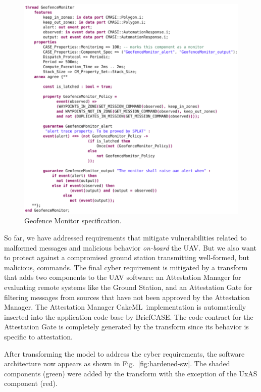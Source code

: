 \documentclass[global,twocolumn]{svjour}
\newcommand{\figref}[1]{Fig.~\ref{#1}}
\newcommand{\brfcs}{BriefCASE}
\newcommand{\ckml}{CakeML}
\begin{document}
\begin{figure}[h]
	\centering
	\includegraphics[width=1\columnwidth]{figs/geofence-monitor.png}
	\caption{Geofence Monitor specification.}
	\label{fig:geofence-monitor}
\end{figure}

So far, we have addressed requirements that mitigate vulnerabilities related to malformed messages and malicious behavior \textit{on-board} the UAV.
%
But we also want to protect against a compromised ground station transmitting well-formed, but malicious, commands.
%
The final cyber requirement is mitigated by a transform that adds two components to the UAV software: an Attestation Manager for evaluating remote systems like the Ground Station, and an Attestation Gate for filtering messages from sources that have not been approved by the Attestation Manager.
%
The Attestation Manager \ckml\ implementation is automatically inserted into the application code base by \brfcs.
%
The code contract for the Attestation Gate is completely generated by the transform since its behavior is specific to attestation.

After transforming the model to address the cyber requirements, the software architecture now appears as shown in \figref{fig:hardened-sw}.
%
The shaded components (green) were added by the transform with the exception of the UxAS component (red).
\end{document}
